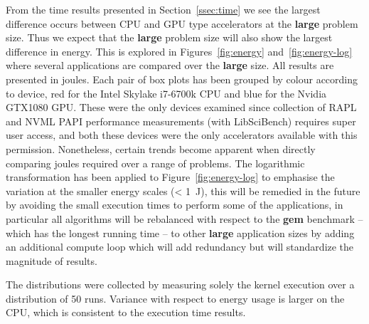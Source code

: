 \documentclass[../document.tex]{subfiles}
\begin{document}

From the time results presented in Section~\ref{ssec:time} we see the largest difference occurs between CPU and GPU type accelerators at the {\bf large} problem size.
Thus we expect that the {\bf large} problem size will also show the largest difference in energy.
This is explored in Figures~\ref{fig:energy} and~\ref{fig:energy-log} where several applications are compared over the {\bf large} size.
All results are presented in joules.
Each pair of box plots has been grouped by colour according to device, red for the Intel Skylake i7-6700k CPU and blue for the Nvidia GTX1080 GPU.
These were the only devices examined since collection of RAPL and NVML PAPI performance measurements (with LibSciBench) requires super user access, and both these devices were the only accelerators available with this permission.
Nonetheless, certain trends become apparent when directly comparing joules required over a range of problems.
The logarithmic transformation has been applied to Figure~\ref{fig:energy-log} to emphasise the variation at the smaller energy scales (< \SI{1}{\joule}), this will be remedied in the future by avoiding the small execution times to perform some of the applications, in particular all algorithms will be rebalanced with respect to the {\bf gem} benchmark -- which has the longest running time -- to other {\bf large} application sizes by adding an additional compute loop which will add redundancy but will standardize the magnitude of results.

The distributions were collected by measuring solely the kernel execution over a distribution of 50 runs.
Variance with respect to energy usage is larger on the CPU, which is consistent to the execution time results.
\end{document}
